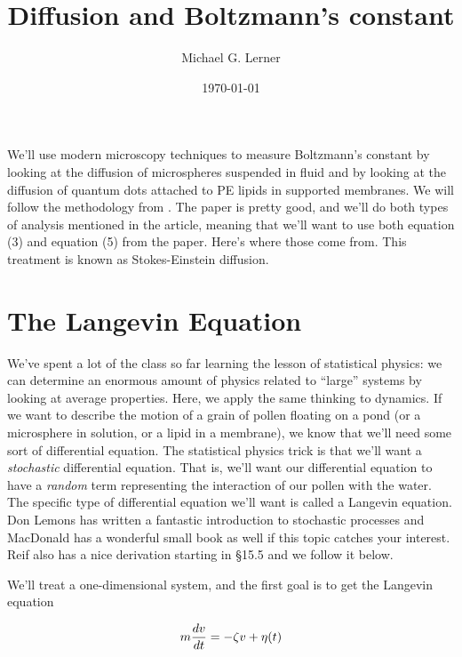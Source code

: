 \documentclass[12pt]{article}
\begin{document}
\setlength{\unitlength}{1in}
\title{Diffusion and Boltzmann's constant}
\author{Michael G. Lerner}
\date{\today}
\maketitle

We'll use modern microscopy techniques to measure Boltzmann's constant
by looking at the diffusion of microspheres suspended in fluid and by
looking at the diffusion of quantum dots attached to PE lipids in
supported membranes. We will follow the methodology from
\cite{nakroshis2003measuring}. The paper is pretty good, and we'll do
both types of analysis mentioned in the article, meaning that we'll
want to use both equation (3) and equation (5) from the paper. Here's
where those come from. This treatment is known as Stokes-Einstein
diffusion.
\section{The Langevin Equation}

We've spent a lot of the class so far learning the lesson of
statistical physics: we can determine an enormous amount of physics
related to ``large'' systems by looking at average properties. Here,
we apply the same thinking to dynamics. If we want to describe the
motion of a grain of pollen floating on a pond (or a microsphere in
solution, or a lipid in a membrane), we know that we'll need some sort
of differential equation. The statistical physics trick is that we'll
want a \textit{stochastic} differential equation. That is, we'll want
our differential equation to have a \textit{random} term representing
the interaction of our pollen with the water. The specific type of
differential equation we'll want is called a Langevin equation. Don
Lemons has written a fantastic introduction to stochastic processes
\cite{LemonsStochasticIntro} and MacDonald \cite{MacDonaldNoise} has a
wonderful small book as well if this topic catches your interest. Reif
\cite{ReifStatMech} also has a nice derivation starting in \S15.5 and
we follow it below.

We'll treat a one-dimensional system, and the first goal is to get the
Langevin equation

\begin{equation}
  \label{Langevin}
  m\frac{d v}{d t} = -\zeta v + \eta(t)
\end{equation}
\end{document}
